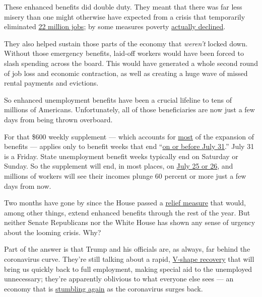 These enhanced benefits did double duty. They meant that there was far
less misery than one might otherwise have expected from a crisis that
temporarily eliminated
\href{https://fred.stlouisfed.org/series/PAYEMS}{22 million jobs}; by
some measures poverty
\href{https://harris.uchicago.edu/news-events/news/new-poverty-measure-confirms-coronavirus-driven-federal-stimulus-measures-were}{actually
declined}.

They also helped sustain those parts of the economy that \emph{weren't}
locked down. Without those emergency benefits, laid-off workers would
have been forced to slash spending across the board. This would have
generated a whole second round of job loss and economic contraction, as
well as creating a huge wave of missed rental payments and evictions.

So enhanced unemployment benefits have been a crucial lifeline to tens
of millions of Americans. Unfortunately, all of those beneficiaries are
now just a few days from being thrown overboard.

For that \$600 weekly supplement --- which accounts for
\href{https://www.bea.gov/system/files/2020-06/Effects-of-Selected-Federal-Pandemic-Response-Programs-on-Personal-Income-May-2020.pdf}{most}
of the expansion of benefits --- applies only to benefit weeks that end
``\href{https://www.natlawreview.com/article/additional-600-unemployment-payment-expiration-date-looms-near}{on
or before July 31}.'' July 31 is a Friday. State unemployment benefit
weeks typically end on Saturday or Sunday. So the supplement will end,
in most places, on
\href{https://www.cnbc.com/2020/06/26/the-extra-600-unemployment-benefits-will-end-before-july-31.html}{July
25 or 26}, and millions of workers will see their incomes plunge 60
percent or more just a few days from now.

Two months have gone by since the House passed a
\href{https://www.congress.gov/bill/116th-congress/house-bill/6800}{relief
measure} that would, among other things, extend enhanced benefits
through the rest of the year. But neither Senate Republicans nor the
White House has shown any sense of urgency about the looming crisis.
Why?

Part of the answer is that Trump and his officials are, as always, far
behind the coronavirus curve. They're still talking about a rapid,
\href{https://twitter.com/JStein_WaPo/status/1282349502284865536}{V-shape
recovery} that will bring us quickly back to full employment, making
special aid to the unemployed unnecessary; they're apparently oblivious
to what everyone else sees --- an economy that is
\href{https://www.nytimes.com/2020/07/15/business/economy/economic-recovery-coronavirus-resurgence.html}{stumbling
again} as the coronavirus surges back.

